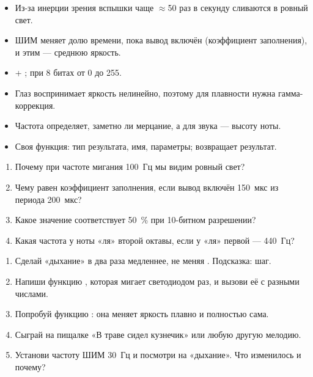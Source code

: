\begin{summary}
\begin{itemize}[leftmargin=*]
  \item Из-за инерции зрения вспышки чаще $\approx$50 раз в секунду сливаются в ровный свет.
  \item ШИМ меняет долю времени, пока вывод включён (коэффициент заполнения), и этим --- среднюю яркость.
  \item {} + ; при 8 битах  от 0 до 255.
  \item Глаз воспринимает яркость нелинейно, поэтому для плавности нужна гамма-коррекция.
  \item Частота определяет, заметно ли мерцание, а для звука --- высоту ноты.
  \item Своя функция: тип результата, имя, параметры;  возвращает результат.
\end{itemize}
\end{summary}

\begin{quiz}
\begin{enumerate}
  \item Почему при частоте мигания 100~Гц мы видим ровный свет?
  \item Чему равен коэффициент заполнения, если вывод включён 150~мкс из периода 200~мкс?
  \item Какое значение  соответствует 50~\% при 10-битном разрешении?
  \item Какая частота у ноты «ля» второй октавы, если у «ля» первой --- 440~Гц?
\end{enumerate}
\end{quiz}

\begin{tasks}
\begin{enumerate}
  \item Сделай «дыхание» в два раза медленнее, не меняя . Подсказка: шаг.
  \item Напиши функцию , которая мигает светодиодом  раз, и вызови её с разными числами.
  \item Попробуй функцию : она меняет яркость плавно и полностью сама.
  \item Сыграй на пищалке «В траве сидел кузнечик» или любую другую мелодию.
  \item Установи частоту ШИМ 30~Гц и посмотри на «дыхание». Что изменилось и почему?
\end{enumerate}
\end{tasks}
